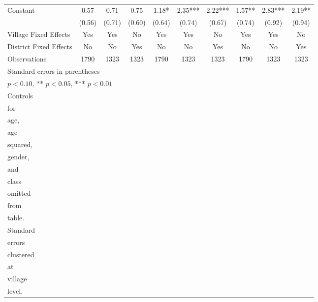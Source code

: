 \begin{sidewaystable}[htbp]
\begin{tabular}{l*{9}{c}}
Constant        &     0.57   &     0.71   &     0.75   &     1.18*  &     2.35***&     2.22***&     1.57** &     2.83***&     2.19** \\
                &   (0.56)   &   (0.71)   &   (0.60)   &   (0.64)   &   (0.74)   &   (0.67)   &   (0.74)   &   (0.92)   &   (0.94)   \\
Village Fixed Effects&      Yes   &      Yes   &       No   &      Yes   &      Yes   &       No   &      Yes   &      Yes   &       No   \\
District Fixed Effects&       No   &       No   &      Yes   &       No   &       No   &      Yes   &       No   &       No   &      Yes   \\
\midrule
Observations    &     1790   &     1323   &     1323   &     1790   &     1323   &     1323   &     1790   &     1323   &     1323   \\
\bottomrule
\multicolumn{10}{l}{\footnotesize Standard errors in parentheses}\\
\multicolumn{10}{l}{\footnotesize * \(p<0.10\), ** \(p<0.05\), *** \(p<0.01\)}\\
\multicolumn{10}{l}{\footnotesize Controls}\\
\multicolumn{10}{l}{\footnotesize for}\\
\multicolumn{10}{l}{\footnotesize age,}\\
\multicolumn{10}{l}{\footnotesize age}\\
\multicolumn{10}{l}{\footnotesize squared,}\\
\multicolumn{10}{l}{\footnotesize gender,}\\
\multicolumn{10}{l}{\footnotesize and}\\
\multicolumn{10}{l}{\footnotesize class}\\
\multicolumn{10}{l}{\footnotesize omitted}\\
\multicolumn{10}{l}{\footnotesize from}\\
\multicolumn{10}{l}{\footnotesize table.}\\
\multicolumn{10}{l}{\footnotesize Standard}\\
\multicolumn{10}{l}{\footnotesize errors}\\
\multicolumn{10}{l}{\footnotesize clustered}\\
\multicolumn{10}{l}{\footnotesize at}\\
\multicolumn{10}{l}{\footnotesize village}\\
\multicolumn{10}{l}{\footnotesize level.}\\
\end{tabular}
\end{sidewaystable}
